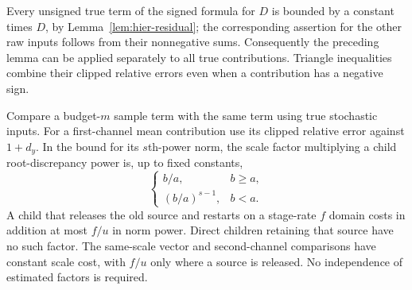 Every unsigned true term of the signed formula for $D$ is bounded by a
constant times $D$, by Lemma~\ref{lem:hier-residual}; the corresponding
assertion for the other raw inputs follows from their nonnegative sums.
Consequently the preceding lemma can be applied separately to all true
contributions.  Triangle inequalities combine their clipped relative
errors even when a contribution has a negative sign.

\begin{lemma}\label{lem:est-mean-comparison}
Compare a budget-$m$ sample term with the same term using true stochastic
inputs.  For a first-channel mean contribution use its clipped relative
error against $1+d_y$.  In the bound for its $s$th-power norm, the scale
factor multiplying a child root-discrepancy power is, up to fixed constants,
\[
 \begin{cases}
 b/a,&b\ge a,\\
 (b/a)^{s-1},&b<a.
 \end{cases}
\]
A child that releases the old source and restarts on a stage-rate $f$
domain costs in addition at most $f/u$ in norm power.  Direct children
retaining that source have no such factor.  The same-scale vector and
second-channel comparisons have constant scale cost, with $f/u$ only
where a source is released.  No independence of estimated factors is
required.
\end{lemma}
